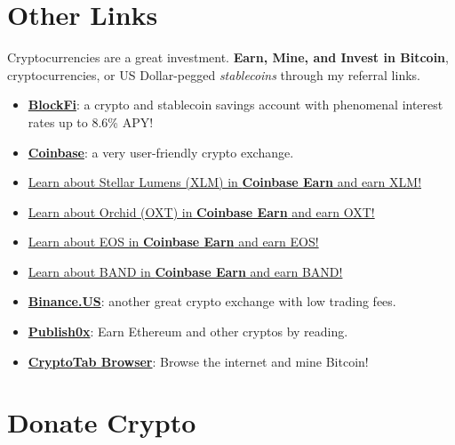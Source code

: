 \section*{Other Links}
\noindent Cryptocurrencies are a great investment. {\bf Earn, Mine, and Invest in Bitcoin}, cryptocurrencies, or US Dollar-pegged {\em stablecoins} through my referral links.
\begin{itemize}   
   \item \href{https://blockfi.mxuy67.net/c/2612759/889697/10568}{{\bf BlockFi}}: a crypto and stablecoin savings account with phenomenal interest rates up to 8.6\% APY! 
   \item \href{https://www.coinbase.com/join/landqu_e}{{\bf Coinbase}}: a very user-friendly crypto exchange.
   \item \href{https://coinbase.com/earn/xlm/invite/cq8rgxt4}{Learn about Stellar Lumens (XLM) in {\bf Coinbase Earn} and earn XLM!}
   \item \href{https://coinbase.com/earn/oxt/invite/39h7v158}{Learn about Orchid (OXT) in {\bf Coinbase Earn} and earn OXT!}
   \item \href{https://coinbase.com/earn/eos/invite/8b95vgnx}{Learn about EOS in {\bf Coinbase Earn} and earn EOS!}
   \item \href{https://coinbase.com/earn/band/invite/2s49zc65}{Learn about BAND in {\bf Coinbase Earn} and earn BAND!}
   \item \href{https://www.binance.us/?ref=35061022}{{\bf Binance.US}}: another great crypto exchange with low trading fees.
   \item \href{https://www.publish0x.com?a=Jxbo2qkAag}{{\bf Publish0x}}: Earn Ethereum and other cryptos by reading.
   \item \href{https://cryptotabbrowser.com/16356908}{{\bf CryptoTab Browser}}: Browse the internet and mine Bitcoin!
\end{itemize}

\section*{Donate Crypto}


